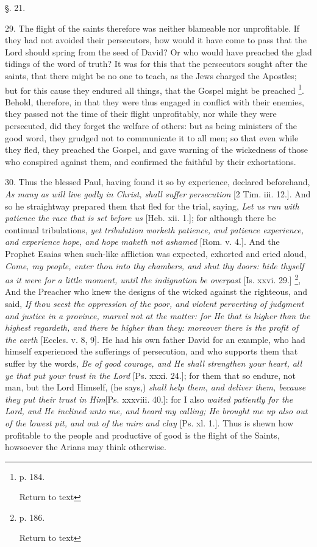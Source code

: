 §. 21.

29. The flight of the saints therefore was
neither blameable nor unprofitable. If they had not avoided their
persecutors, how would it have come to pass that the Lord should
spring from the seed of David? Or who would have preached the glad
tidings of the word of truth? It was for this that the persecutors
sought after the saints, that there might be no one to teach, as the
Jews charged the Apostles; but for this cause they endured all things,
that the Gospel might be preached \footnote{p. 184.

Return to text}.
Behold, therefore, in that they were thus engaged in conflict with
their enemies, they passed not the time of their flight unprofitably,
nor while they were persecuted, did they forget the welfare of others:
but as being ministers of the good word, they grudged not to
communicate it to all men; so that even while they fled, they preached
the Gospel, and gave warning of the wickedness of those who conspired
against them, and confirmed the faithful by their exhortations.

30. Thus the blessed Paul, having found it so by
experience, declared beforehand, \emph{As many as will live godly in
Christ, shall suffer persecution} [2 Tim. iii. 12.]. And so he
straightway prepared them that fled for the trial, saying, \emph{Let us
run with patience the race that is set before us} [Heb. xii. 1.];
for although there be continual tribulations, \emph{yet tribulation
worketh patience, and patience experience, and experience hope, and
hope maketh not ashamed} [Rom. v. 4.]. And the Prophet Esaias when
such-like affliction was expected, exhorted and cried aloud, \emph{Come,
my people, enter thou into thy chambers, and shut thy doors: hide
thyself as it were for a little moment, until the indignation be
overpast} [Is. xxvi. 29.] \footnote{p. 186.

Return to text}, And
the Preacher who knew the designs of the wicked against the righteous,
and said, \emph{If thou seest the oppression of the poor, and violent
perverting of judgment and justice in a province, marvel not at the
matter: for He that is higher than the highest regardeth, and there be
higher than they: moreover there is the profit of the earth}
[Eccles. v. 8, 9]. He had his own father David for an example, who had
himself experienced the sufferings of persecution, and who supports
them that suffer by the words, \emph{Be of good courage, and He shall
strengthen your heart, all ye that put your trust in the Lord} [Ps.
xxxi. 24.]; for them that so endure, not man, but the Lord Himself,
(he says,) \emph{shall help them, and deliver them, because they put
their trust in Him}[Ps. xxxviii. 40.]: for I also \emph{waited
patiently for the Lord, and He inclined unto me, and heard my calling;
He brought me up also out of the lowest pit, and out of the mire and
clay} [Ps. xl. 1.]. Thus is shewn how profitable to the people and
productive of good is the flight of the Saints, howsoever the Arians
may think otherwise.


